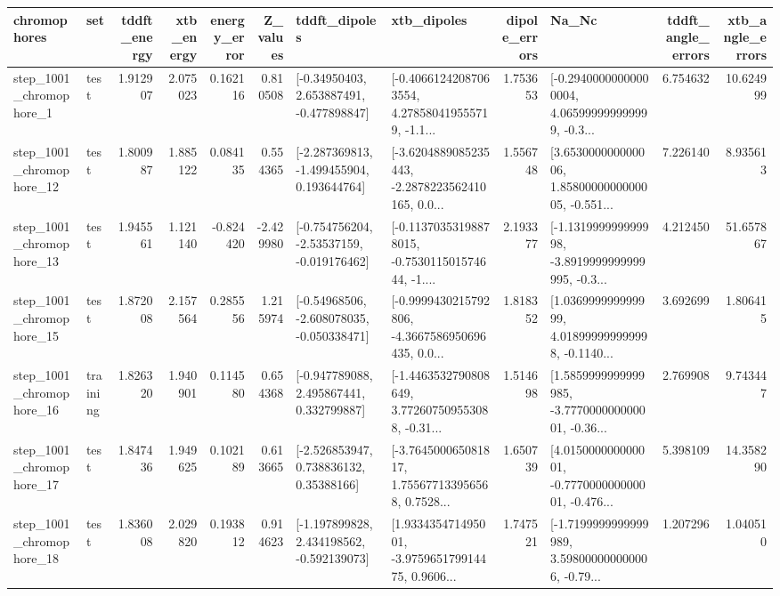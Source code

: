 \begin{tabular}{llrrrrllrlrr}
\toprule
             chromophores &       set &  tddft\_energy &  xtb\_energy &  energy\_error &  Z\_values &                               tddft\_dipoles &                                        xtb\_dipoles &  dipole\_errors &                                              Na\_Nc &  tddft\_angle\_errors &  xtb\_angle\_errors \\
\midrule
  step\_1001\_chromophore\_1 &      test &      1.912907 &    2.075023 &      0.162116 &  0.810508 &    [-0.34950403, 2.653887491, -0.477898847] &  [-0.40661242087063554, 4.278580419555719, -1.1... &       1.753653 &  [-0.29400000000000004, 4.065999999999999, -0.3... &            6.754632 &         10.624999 \\
 step\_1001\_chromophore\_12 &      test &      1.800987 &    1.885122 &      0.084135 &  0.554365 &   [-2.287369813, -1.499455904, 0.193644764] &  [-3.6204889085235443, -2.2878223562410165, 0.0... &       1.556748 &  [3.653000000000006, 1.8580000000000005, -0.551... &            7.226140 &          8.935613 \\
 step\_1001\_chromophore\_13 &      test &      1.945561 &    1.121140 &     -0.824420 & -2.429980 &   [-0.754756204, -2.53537159, -0.019176462] &  [-0.11370353198878015, -0.753011501574644, -1.... &       2.193377 &  [-1.131999999999998, -3.8919999999999995, -0.3... &            4.212450 &         51.657867 \\
 step\_1001\_chromophore\_15 &      test &      1.872008 &    2.157564 &      0.285556 &  1.215974 &   [-0.54968506, -2.608078035, -0.050338471] &  [-0.9999430215792806, -4.3667586950696435, 0.0... &       1.818352 &  [1.036999999999999, 4.018999999999998, -0.1140... &            3.692699 &          1.806415 \\
 step\_1001\_chromophore\_16 &  training &      1.826320 &    1.940901 &      0.114580 &  0.654368 &    [-0.947789088, 2.495867441, 0.332799887] &  [-1.4463532790808649, 3.772607509553088, -0.31... &       1.514698 &  [1.5859999999999985, -3.777000000000001, -0.36... &            2.769908 &          9.743447 \\
 step\_1001\_chromophore\_17 &      test &      1.847436 &    1.949625 &      0.102189 &  0.613665 &     [-2.526853947, 0.738836132, 0.35388166] &  [-3.764500065081817, 1.755677133956568, 0.7528... &       1.650739 &  [4.015000000000001, -0.777000000000001, -0.476... &            5.398109 &         14.358290 \\
 step\_1001\_chromophore\_18 &      test &      1.836008 &    2.029820 &      0.193812 &  0.914623 &   [-1.197899828, 2.434198562, -0.592139073] &  [1.933435471495001, -3.975965179914475, 0.9606... &       1.747521 &  [-1.7199999999999989, 3.598000000000006, -0.79... &            1.207296 &          1.040510 \\

\end{tabular}
